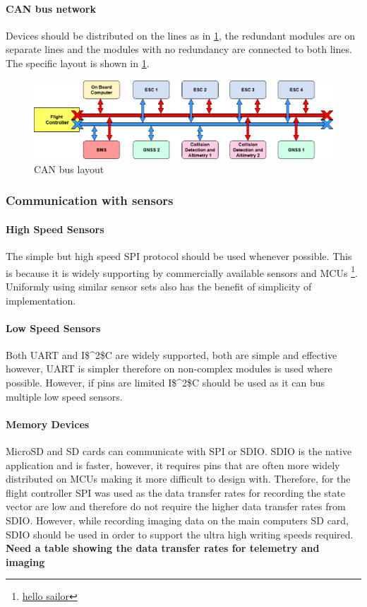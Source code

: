 \paragraph{CAN bus network}
Devices should be distributed on the lines as in \ref{fig:CAN_bus}, the redundant modules are on separate lines and the modules with no redundancy are connected to both lines. The specific layout is shown in \ref{fig:CAN_bus}.
 \begin{figure}[h!]
 \centering
  \includegraphics[width=1\textwidth]{figs/Thomas/Intra Communication/CAN bus.png}
 \caption{CAN bus layout}
 \label{fig:CAN_bus}
 \end{figure}
 
\subsubsection{Communication with sensors}
\paragraph{High Speed Sensors}
The simple but high speed \gls{SPI} protocol should be used whenever possible. This is because it is widely supporting by commercially available sensors and \gls{MCU}s \footnote{\url{hello sailor}}. Uniformly using similar sensor sets also has the benefit of simplicity of implementation.
\paragraph{Low Speed Sensors}
Both \gls{UART} and \gls{I$^2$C} are widely supported, both are simple and effective however, \gls{UART} is simpler therefore on non-complex modules is used where possible. However, if pins are limited \gls{I$^2$C} should be used as it can bus multiple low speed sensors.
\paragraph{Memory Devices}
MicroSD and SD cards can communicate with \gls{SPI} or \gls{SDIO}. \gls{SDIO} is the native application and is faster, however, it requires pins that are often more widely distributed on \gls{MCU}s making it more difficult to design with. Therefore, for the flight controller \gls{SPI} was used as the data transfer rates for recording the state vector are low and therefore do not require the higher data transfer rates from \gls{SDIO}. However, while recording imaging data on the main computers SD card, \gls{SDIO} should be used in order to support the ultra high writing speeds required. \textbf{Need a table showing the data transfer rates for telemetry and imaging}
